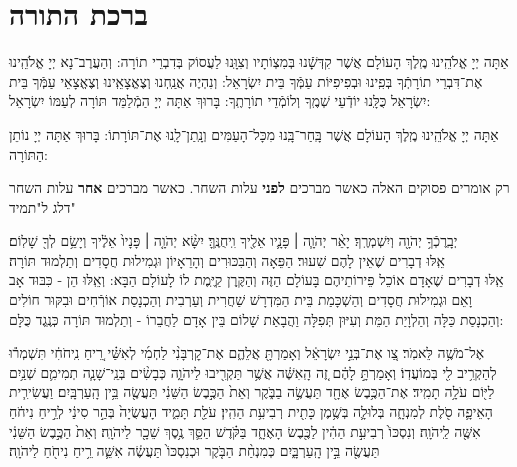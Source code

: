 \documentclass[twoside, openany, parskip=half, 11pt]{book}
\begin{document}
\section[ברכת התורה]{ ברכת התורה }

אַתָּה יְיָ אֱלֹהֵֽינוּ מֶֽלֶךְ הָעוֹלָם אֲשֶׁר קִדְּשָֽֿׁנוּ בְּמִצְוֹתָיו וְצִוָּֽנוּ לַעֲסוֹק בְּדִבְרֵי תוֹרָה: וְהַעֲרֶב־נָא יְיָ אֱלֹהֵֽינוּ אֶת־דִּבְרֵי תוֹרָתְֿךָ בְּפִֽינוּ וּבְפִיפִיּוֹת עַמְּֿךָ בֵּית יִשְׂרָאֵל: וְנִהְיֶה אֲנַֽחְנוּ וְצֶאֱצָאֵֽינוּ וְצֶאֱצָאֵי עַמְּֿךָ בֵּית יִשְׂרָאֵל כֻּלָּֽנוּ יוֹדְֿעֵי שְׁמֶֽךָ וְלוֹמְֿדֵי תוֹרָתֶֽךָ: בָּרוּךְ אַתָּה יְיָ הַמְֿלַמֵּד תּוֹרָה לְעַמּוֹ יִשְׂרָאֵל:
 
אַתָּה יְיָ אֱלֹהֵֽינוּ מֶֽלֶךְ הָעוֹלָם אֲשֶׁר בָּֽחַר־בָּֽנוּ מִכָּל־הָעַמִּים וְנָֽתַן־לָֽנוּ אֶת־תּוֹרָתוֹ: בָּרוּךְ אַתָּה יְיָ נוֹתֵן הַתּוֹרָה:

\nextpage

\begin{sometimes}

\begin{scriptsize}
\textsf{
רק אומרים פסוקים האלה כאשר מברכים \textbf{לפני} עלות השחר.
כאשר מברכים \textbf{אחר} עלות השחר דלג ל"תמיד"}

\end{scriptsize}

יְבָֽרֶכְֿךָ֥ יְהֹוָ֖ה וְיִשְׁמְרֶֽךָ׃  יָאֵ֨ר יְהֹוָ֧ה ׀ פָּנָ֛יו אֵלֶ֖יךָ וִֽיחֻנֶּֽךָּ׃ יִשָּׂ֨א יְהֹוָ֤ה ׀ פָּנָיו֙ אֵלֶ֔יךָ וְיָשֵׂ֥ם לְךָ֖ שָׁלֽוֹם׃\\
אֵֽלּוּ דְבָרִים שֶׁאֵין לָהֶם שִׁעוּר׃ הַפֵּאָה וְהַבִּכּוּרִים וְהָרֵאָיוֹן וּגְמִילוּת חֲסָדִים וְתַלְמוּד תּוֹרָה׃\\
אֵֽלּוּ דְבָרִים שֶׁאָדָם אוֹכֵל פֵּירוֹתֵיהֶם בָּעוֹלָם הַזֶּה וְהַקֶּֽרֶן קַיֶּֽמֶת לוֹ לָעוֹלָם הַבָּא: וְאֵֽלּוּ הֵן - כִּבּוּד אָב וָאֵם וּגְמִילוּת חֲסָדִים וְהַשְׁכָּמַת בֵּית הַמִּדְרָשׁ שַׁחֲרִית וְעַרְבִית וְהַכְנָסַת אוֹרְֿחִים וּבִקּוּר חוֹלִים וְהַכְנָסַת כַּלָּה וְהַלְוָיַת הַמֵּת וְעִיּוּן תְּפִלָּה וַהֲבָאַת שָׁלוֹם בֵּין אָדָם לַחֲבֵרוֹ - וְתַלְמוּד תּוֹרָה כְּנֶֽגֶד כֻּלָּם:

\end{sometimes}


 אֶל־מֹשֶׁ֥ה לֵּאמֹֽר׃ 
צַ֚ו אֶת־בְּנֵ֣י יִשְׂרָאֵ֔ל וְאָמַרְתָּ֖ אֲלֵהֶ֑ם אֶת־קׇרְבָּנִ֨י לַחְמִ֜י לְאִשַּׁ֗י רֵ֚יחַ נִֽיחֹחִ֔י תִּשְׁמְר֕וּ לְהַקְרִ֥יב לִ֖י בְּמוֹעֲדֽוֹ׃
וְאָמַרְתָּ֣ לָהֶ֔ם זֶ֚ה הָֽאִשֶּׁ֔ה אֲשֶׁ֥ר תַּקְרִ֖יבוּ לַיהֹוָ֑ה כְּבָשִׂ֨ים בְּנֵֽי־שָׁנָ֧ה תְמִימִ֛ם שְׁנַ֥יִם לַיּ֖וֹם עֹלָ֥ה תָמִֽיד׃ 
אֶת־הַכֶּ֥בֶשׂ אֶחָ֖ד תַּעֲשֶׂ֣ה בַבֹּ֑קֶר וְאֵת֙ הַכֶּ֣בֶשׂ הַשֵּׁנִ֔י תַּעֲשֶׂ֖ה בֵּ֥ין הָֽעַרְבָּֽיִם׃
וַעֲשִׂירִ֧ית הָאֵיפָ֛ה סֹ֖לֶת לְמִנְחָ֑ה בְּלוּלָ֛ה בְּשֶׁ֥מֶן כָּתִ֖ית רְבִיעִ֥ת הַהִֽין׃ 
עֹלַ֖ת תָּמִ֑יד הָעֲשֻׂיָה֙ בְּהַ֣ר סִינַ֔י לְרֵ֣יחַ נִיחֹ֔חַ אִשֶּׁ֖ה לַֽיהֹוָֽה׃ וְנִסְכּוֹ֙ רְבִיעִ֣ת הַהִ֔ין לַכֶּ֖בֶשׂ הָאֶחָ֑ד בַּקֹּ֗דֶשׁ הַסֵּ֛ךְ נֶ֥סֶךְ שֵׁכָ֖ר לַיהֹוָֽה׃ 
וְאֵת֙ הַכֶּ֣בֶשׂ הַשֵּׁנִ֔י תַּעֲשֶׂ֖ה בֵּ֣ין הָֽעַרְבָּ֑יִם כְּמִנְחַ֨ת הַבֹּ֤קֶר וּכְנִסְכּוֹ֙ תַּעֲשֶׂ֔ה אִשֵּׁ֛ה רֵ֥יחַ נִיחֹ֖חַ לַיהֹוָֽה׃ 
 
\end{document}
